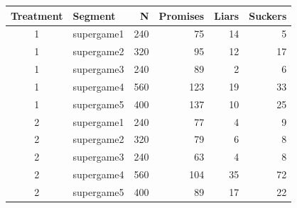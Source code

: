 \begin{tabular}{clrrrr}
  \toprule
Treatment & Segment & N & Promises & Liars & Suckers \\
  \midrule
  1 & supergame1 & 240 &  75 &  14 &   5 \\
    1 & supergame2 & 320 &  95 &  12 &  17 \\
    1 & supergame3 & 240 &  89 &   2 &   6 \\
    1 & supergame4 & 560 & 123 &  19 &  33 \\
    1 & supergame5 & 400 & 137 &  10 &  25 \\
    2 & supergame1 & 240 &  77 &   4 &   9 \\
    2 & supergame2 & 320 &  79 &   6 &   8 \\
    2 & supergame3 & 240 &  63 &   4 &   8 \\
    2 & supergame4 & 560 & 104 &  35 &  72 \\
    2 & supergame5 & 400 &  89 &  17 &  22 \\
   \bottomrule
\end{tabular}
